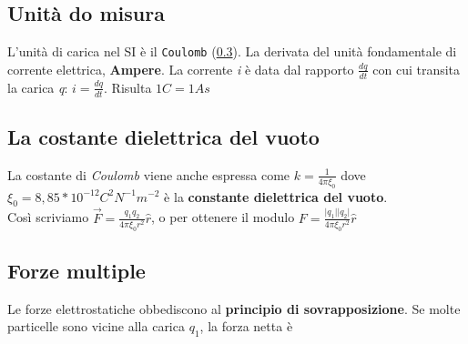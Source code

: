 \documentclass{book}
\newcommand{\abs}[1]{\lvert#1\rvert}
\begin{document}
\subsection{Unità do misura}
L'unità di carica nel SI è il \texttt{Coulomb} (\ref{}). La derivata del unità
fondamentale di corrente elettrica, \textbf{Ampere}. La corrente \textit{i} è
data dal rapporto $\frac{dq}{dt}$ con cui transita la carica \textit{q}: 
$i=\frac{dq}{dt}$.
Risulta $1C=1As$
\subsection{La costante dielettrica del vuoto}
La costante di \textit{Coulomb} viene anche espressa come
$k=\frac{1}{4\pi\xi_0}$ dove $\xi_0 = 8,85*10^{-12}C^2N^{-1}m^{-2}$ è la
\textbf{constante dielettrica del vuoto}.\\
Così scriviamo $\vec{F}=\frac{q_1q_2}{4\pi\xi_0r^2}\hat{r}$, o per ottenere il
modulo $F=\frac{\abs{q_1}\abs{q_2}}{4\pi\xi_0r^2}\hat{r}$
\subsection{Forze multiple}
Le forze elettrostatiche obbediscono al \textbf{principio di sovrapposizione}.
Se molte particelle sono vicine alla carica $q_1$, la forza netta è
\end{document}
